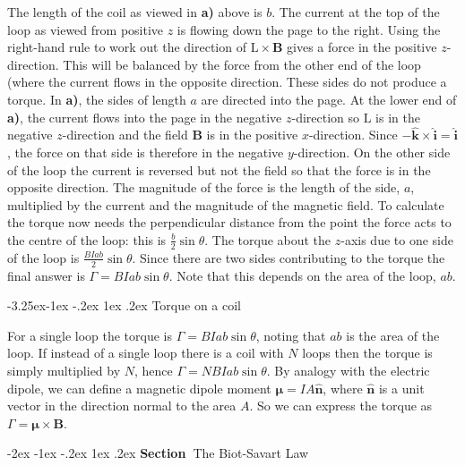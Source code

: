 \documentclass[
]{book}
\makeatletter
\renewcommand\section{%
\@startsection{section}{1}{\z@}%
              {-2ex \@plus -1ex \@minus -.2ex}%
              {1ex \@plus .2ex}%
              {\sffamily\bfseries\large\noindent Section~}}
\renewcommand\subsection{%
\@startsection{subsection}{2}{\z@}%
              {-3.25ex\@plus -1ex \@minus -.2ex}%
              {1ex \@plus .2ex}%
              {\sffamily\bfseries}}
\numberwithin{equation}{section}
\makeatother
\begin{document}
The length of the coil as viewed in \textbf{a)} above is \(b\). The current at the
top of the loop as viewed from positive \(z\) is flowing down the page to
the right. Using the right-hand rule to work out the direction of
\(\mathrm{L} \times \mathbf{B}\) gives a force in the positive \(z\)-direction. This will be
balanced by the force from the other end of the loop (where the current
flows in the opposite direction. These sides do not produce a torque. In
\textbf{a)}, the sides of length \(a\) are directed into the page. At the lower
end of \textbf{a)}, the current flows into the page in the negative
\(z\)-direction so \(\mathrm{L}\) is in the negative \(z\)-direction and the field
\(\mathbf{B}\) is in the positive \(x\)-direction. Since
\(-\hat{\mathbf{k}} \times \hat{\mathbf{i}} = \hat{\mathbf{i}}\), the force on that side is
therefore in the negative \(y\)-direction. On the other side of the loop
the current is reversed but not the field so that the force is in the
opposite direction. The magnitude of the force is the length of the
side, \(a\), multiplied by the current and the magnitude of the magnetic
field. To calculate the torque now needs the perpendicular distance from
the point the force acts to the centre of the loop: this is
\(\frac{b}{2}\sin\theta\). The torque about the \(z\)-axis due to one side
of the loop is \(\frac{BIab}{2} \sin \theta\). Since there are two sides
contributing to the torque the final answer is
\(\Gamma = BIab \sin\theta\). Note that this depends on the area of the
loop, \(ab\).

\hypertarget{torque-on-a-coil}{%
\subsection{Torque on a coil}\label{torque-on-a-coil}}

For a single loop the torque is \(\Gamma = BIab \sin\theta\), noting that
\(ab\) is the area of the loop. If instead of a single loop there is a
coil with \(N\) loops then the torque is simply multiplied by \(N\), hence
\(\Gamma = NBIab \sin\theta\). By analogy with the electric dipole, we can
define a magnetic dipole moment \(\boldsymbol{\mu} = IA \hat{\mathbf{n}}\), where
\(\hat{\mathbf{n}}\) is a unit vector in the direction normal to the area \(A\). So
we can express the torque as \(\Gamma = \boldsymbol{\mu} \times \mathbf{B}\).

\hypertarget{the-biot-savart-law}{%
\section{The Biot-Savart Law}\label{the-biot-savart-law}}
\end{document}
